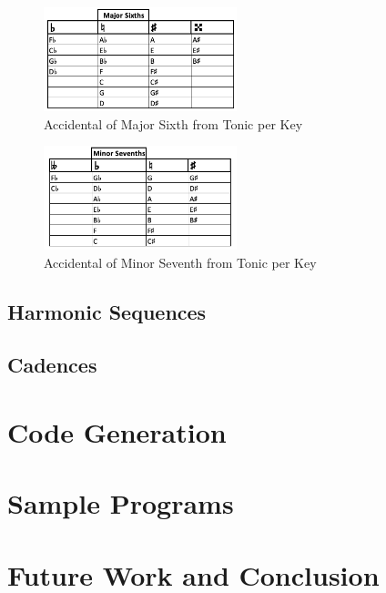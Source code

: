 \documentclass{report}
\begin{document}
\begin{figure}[h!]
\centering
\includegraphics[width=0.5\textwidth]{images/maj_sixths}
\caption{Accidental of Major Sixth from Tonic per Key}
\label{maj_sixths}
\end{figure}

\begin{figure}[h!]
\centering
\includegraphics[width=0.5\textwidth]{images/min_sevenths}
\caption{Accidental of Minor Seventh from Tonic per Key}
\label{min_sevenths}
\end{figure}


\section{Harmonic Sequences}
\section{Cadences}

\chapter{Code Generation}
\label{chap:codegen}

\chapter{Sample Programs}

\chapter{Future Work and Conclusion}
\end{document}
